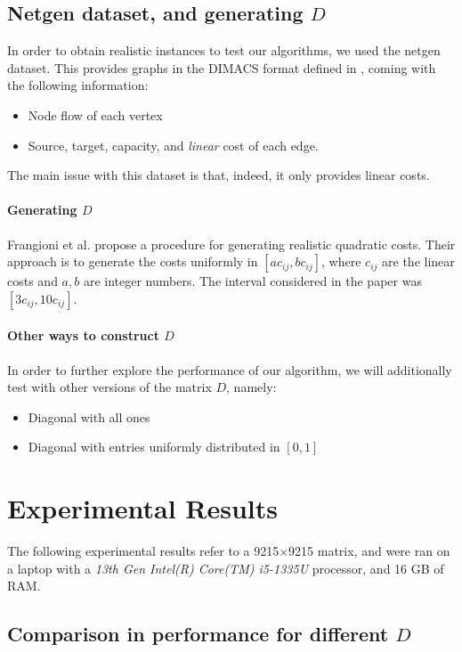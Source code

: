\documentclass{article}
\begin{document}
\subsection{Netgen dataset, and generating $D$}
In order to obtain realistic instances to test our algorithms, we used the netgen \cite{netgenwebsite} dataset. This provides graphs in the DIMACS format defined in \cite{dimacsminflow}, coming with the following information:
\begin{itemize}
 \item Node flow of each vertex
 \item Source, target, capacity, and \emph{linear} cost of each edge.
\end{itemize}
The main issue with this dataset is that, indeed, it only provides linear costs.

\paragraph{Generating $D$} Frangioni et al. \cite{frangioni2011projected} propose a procedure for generating realistic quadratic costs. Their approach is to generate the costs uniformly in $[ac_{ij}, bc_{ij}]$, where $c_{ij}$ are the linear costs and $a,b$ are integer numbers. The interval considered in the paper was $[3c_{ij}, 10c_{ij}]$.

\paragraph{Other ways to construct $D$} In order to further explore the performance of our algorithm, we will additionally test with other versions of the matrix $D$, namely:
\begin{itemize}
 \item Diagonal with all ones
 \item Diagonal with entries uniformly distributed in $[0,1]$
\end{itemize}
\newpage
\section{Experimental Results}

The following experimental results refer to a 9215$\times$9215 matrix, and were ran on a laptop with a \emph{13th Gen Intel(R) Core(TM) i5-1335U} processor, and 16 GB of RAM.

\subsection{Comparison in performance for different $D$}
\end{document}
